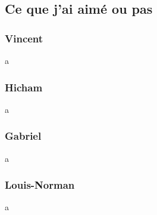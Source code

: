 \begin{center}\HRule \end{center}

\subsection{Ce que j'ai aimé ou pas}
\begin{multicols}{4}
\subsubsection{Vincent}
a
\subsubsection{Hicham}
a
\subsubsection{Gabriel}
a
\subsubsection{Louis-Norman}
a
\end{multicols}

\begin{center}\HRule \end{center}
